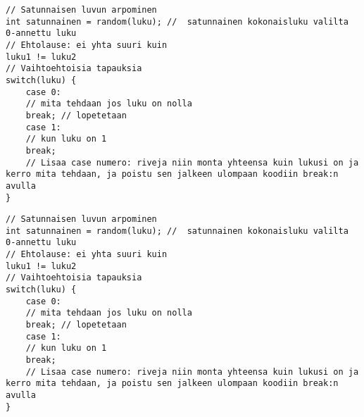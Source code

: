 \begin{tcolorbox}[colback=white,title=Vinkkejä Arduinolla koodaamiseen!,colbacktitle=purple!90, breakable]
\begin{lstlisting}
// Satunnaisen luvun arpominen
int satunnainen = random(luku); //  satunnainen kokonaisluku valilta 0-annettu luku
// Ehtolause: ei yhta suuri kuin
luku1 != luku2
// Vaihtoehtoisia tapauksia
switch(luku) {
    case 0:
    // mita tehdaan jos luku on nolla
    break; // lopetetaan
    case 1: 
    // kun luku on 1
    break;
    // Lisaa case numero: riveja niin monta yhteensa kuin lukusi on ja kerro mita tehdaan, ja poistu sen jalkeen ulompaan koodiin break:n avulla
}
\end{lstlisting}
\end{tcolorbox}

\begin{tcolorbox}[colback=white,title=Vinkkejä Arduinolla koodaamiseen!,colbacktitle=purple!90, breakable]
\begin{lstlisting}
// Satunnaisen luvun arpominen
int satunnainen = random(luku); //  satunnainen kokonaisluku valilta 0-annettu luku
// Ehtolause: ei yhta suuri kuin
luku1 != luku2
// Vaihtoehtoisia tapauksia
switch(luku) {
    case 0:
    // mita tehdaan jos luku on nolla
    break; // lopetetaan
    case 1: 
    // kun luku on 1
    break;
    // Lisaa case numero: riveja niin monta yhteensa kuin lukusi on ja kerro mita tehdaan, ja poistu sen jalkeen ulompaan koodiin break:n avulla
}
\end{lstlisting}
\end{tcolorbox}